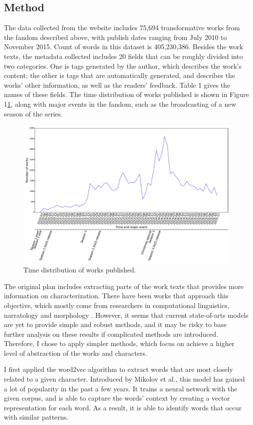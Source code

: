 \documentclass{pnastwo}
\begin{document}
\begin{article}
\section{Method}
The data collected from the website includes 75,694 transformative works from the fandom described above, with publish dates ranging from July 2010 to November 2015. Count of words in this dataset is 405,230,386. 
Besides the work texts, the metadata collected includes 20 fields that can be roughly divided into two categories. One is tags generated by the author, which describes the work's content; the other is tags that are automatically generated, and describes the works' other information, as well as the readers' feedback. Table 1 gives the names of these fields. The time distribution of works published is shown in Figure  1\ref{time_work}, along with major events in the fandom, such as the broadcasting of a new season of the series. 

\begin{figure}
\centerline{\includegraphics[width=.5\textwidth]{time_work.pdf}}
\caption{Time distribution of works published.}\label{time_work}
\end{figure}

The original plan includes extracting parts of the work texts that provides more information on characterization. There have been works that approach this objective, which mostly come from researchers in computational linguistics, narratology and morphology \cite{finlayson2012learning} \cite{noah2013learning}\cite{elsner2012character}\cite{chambers2009unsupervised}. However, it seems that current state-of-arts models are yet to provide simple and robust methods, and it may be risky to base further analysis on these results if complicated methods are introduced. Therefore, I chose to apply simpler methods, which focus on achieve a higher level of abstraction of the works and characters.

I first applied the word2vec algorithm to extract words that are most closely related to a given character. Introduced by Mikolov et al., this model has gained a lot of popularity in the past a few years\cite{mikolov2013efficient}. It trains a neural network with the given corpus, and is able to capture the words' context by creating a vector representation for each word. As a result, it is able to identify words that occur with similar patterns.


\end{article}
\end{document}
